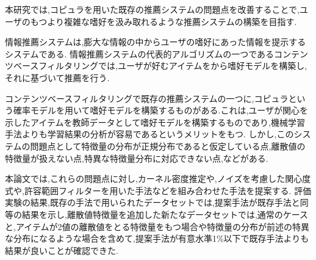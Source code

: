 本研究では,コピュラを用いた既存の推薦システムの問題点を改善することで,ユーザのもつより複雑な嗜好を汲み取れるような推薦システムの構築を目指す.\par
情報推薦システムは,膨大な情報の中からユーザの嗜好にあった情報を提示するシステムである.
情報推薦システムの代表的アルゴリズムの一つであるコンテンツベースフィルタリングでは,ユーザが好むアイテムをから嗜好モデルを構築し,それに基づいて推薦を行う.\par
コンテンツベースフィルタリングで既存の推薦システムの一つに,コピュラという確率モデルを用いて嗜好モデルを構築するものがある.これは,ユーザが関心を示したアイテムを教師データとして嗜好モデルを構築するものであり,機械学習手法よりも学習結果の分析が容易であるというメリットをもつ.
しかし,このシステムの問題点として特徴量の分布が正規分布であると仮定している点,離散値の特徴量が扱えない点,特異な特徴量分布に対応できない点,などがある.\par
本論文では,これらの問題点に対し,カーネル密度推定や,ノイズを考慮した関心度式や,許容範囲フィルターを用いた手法などを組み合わせた手法を提案する.
評価実験の結果,既存の手法で用いられたデータセットでは,提案手法が既存手法と同等の結果を示し,離散値特徴量を追加した新たなデータセットでは,通常のケースと,アイテムが2値の離散値をとる特徴量をもつ場合や特徴量の分布が前述の特異な分布になるような場合を含めて,提案手法が有意水準1\%以下で既存手法よりも結果が良いことが確認できた.
